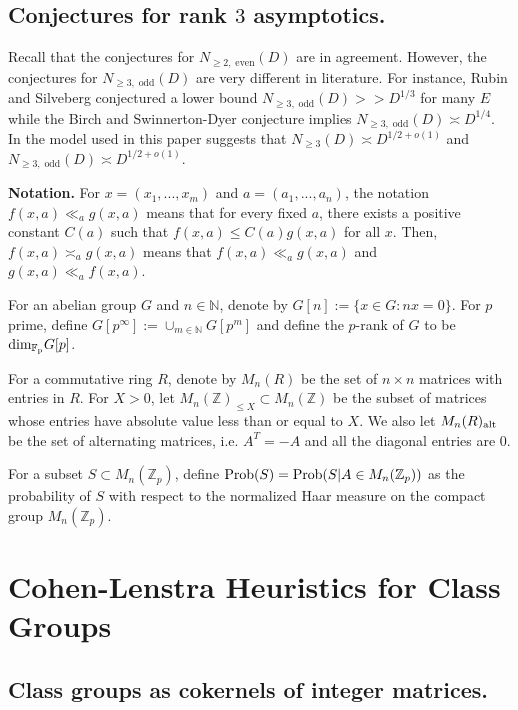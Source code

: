 \documentclass[12pt,reqno]{amsart}
\numberwithin{equation}{section}
\def\Z{{\mathbb Z}}
\def\F{{\mathbb F}}
\def\N{{\mathbb N}}
\begin{document}
\subsection{Conjectures for rank $3$ asymptotics.}

Recall that the conjectures for $N_{\ge 2, \; \text{even}}(D)$ are in agreement. However, the conjectures for $N_{\ge 3, \; \text{odd}}(D)$ are very different in literature. For instance, Rubin and Silveberg conjectured a lower bound $N_{\ge 3, \; \text{odd}}(D) >> D^{1/3}$ for many $E$ while the Birch and Swinnerton-Dyer conjecture implies $N_{\ge 3, \; \text{odd}}(D) \asymp D^{1/4}$. In the model used in this paper suggests that $N_{\ge 3}(D) \asymp D^{1/2+o(1)}$ and $N_{\ge 3, \; \text{odd}}(D) \asymp D^{1/2 + o(1)}$.

\vspace{2mm}

{\bf Notation.} For $x=(x_1, ..., x_m)$ and $a=(a_1, ..., a_n)$, the notation $f(x,a) \ll_a g(x,a)$ means that for every fixed $a$, there exists a positive constant $C(a)$ such that $f(x,a) \le C(a) g(x,a)$ for all $x$. Then, $f(x,a) \asymp_a g(x,a)$ means that $f(x,a) \ll_a g(x,a)$ and $g(x,a) \ll_a f(x,a)$.

For an abelian group $G$ and $n \in \N$, denote by $G[n]:= \{x \in G : nx = 0 \}$. For $p$ prime, define $G[p^\infty]:= \cup_{m \in \N} G[p^m]$ and define the $p$-rank of $G$ to be ${\rm dim_{\F_p}} G[p]$.

For a commutative ring $R$, denote by $M_n(R)$ be the set of $n \times n$ matrices with entries in $R$. For $X >0$, let $M_n(\Z)_{\le X} \subset M_n(\Z)$ be the subset of matrices whose entries have absolute value less than or equal to $X$. We also let $M_n(R)_{\rm alt}$ be the set of alternating matrices, i.e. $A^T = -A$ and all the diagonal entries are $0$.

For a subset $S \subset M_n(\Z_p)$, define ${\rm Prob}(S) = {\rm Prob}(S | A \in M_n(\Z_p))$ as the probability of $S$ with respect to the normalized Haar measure on the compact group $M_n(\Z_p)$.

\section{Cohen-Lenstra Heuristics for Class Groups}

\subsection{Class groups as cokernels of integer matrices.}\label{modelCl}
\end{document}
